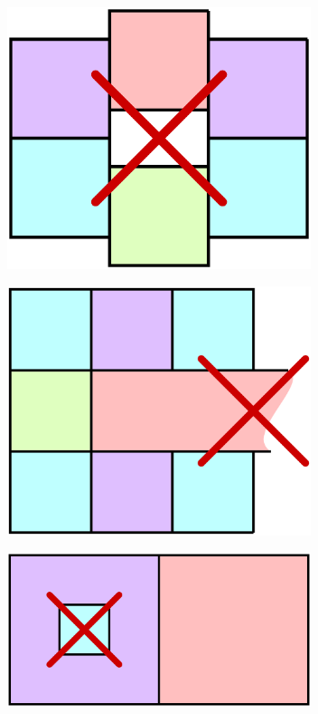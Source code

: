 \documentclass{beamer}
\begin{document}
\begin{frame}
  \begin{center}
    \includegraphics[width=3.5in]{holes}
  \end{center}
\end{frame}

\begin{frame}
  \begin{center}
    \includegraphics[width=3.5in]{nonbounded}
  \end{center}
\end{frame}

\begin{frame}
  \begin{center}
    \includegraphics[width=3.5in]{noncell}
  \end{center}
\end{frame}
\end{document}
